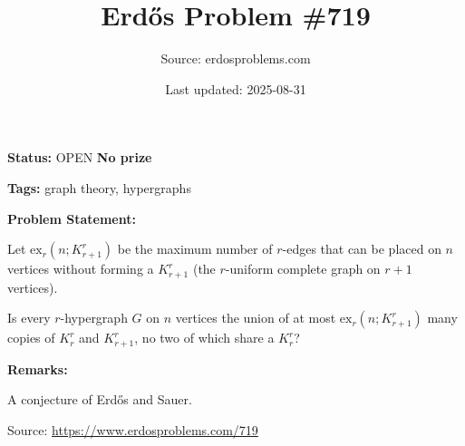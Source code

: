 \documentclass{article}
\title{Erd\H{o}s Problem \#719}
\date{Last updated: 2025-08-31}
\author{Source: erdosproblems.com}
\begin{document}
\maketitle

\noindent\textbf{Status:} OPEN \quad \textbf{No prize}

\noindent\textbf{Tags:} graph theory, hypergraphs

\medskip
\noindent\textbf{Problem Statement:}

Let $\mathrm{ex}_r(n;K_{r+1}^r)$ be the maximum number of $r$-edges that can be placed on $n$ vertices without forming a $K_{r+1}^r$ (the $r$-uniform complete graph on $r+1$ vertices).

Is every $r$-hypergraph $G$ on $n$ vertices the union of at most $\mathrm{ex}_{r}(n;K_{r+1}^r)$ many copies of $K_r^r$ and $K_{r+1}^r$, no two of which share a $K_r^r$?

\bigskip
\noindent\textbf{Remarks:}

A conjecture of Erd\H{o}s and Sauer.

\bigskip
\noindent\small{Source: \url{https://www.erdosproblems.com/719}}
\end{document}
